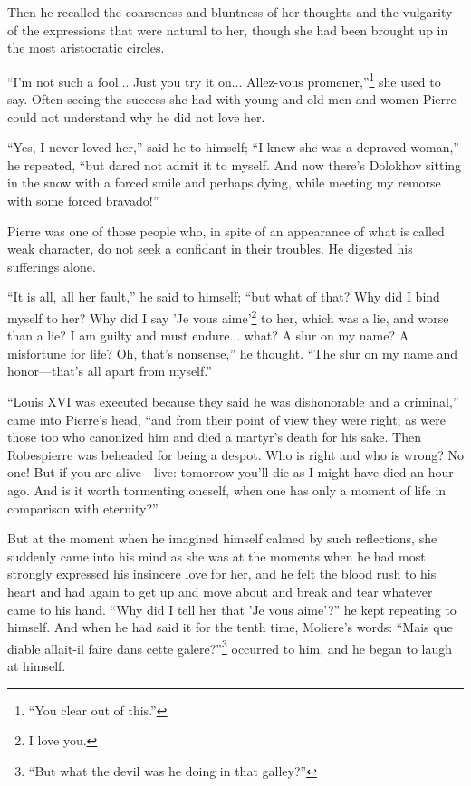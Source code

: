 Then he recalled the coarseness and bluntness of her thoughts and
the vulgarity of the expressions that were natural to her, though
she had been brought up in the most aristocratic circles.

``I'm not such a fool... Just you try it on... Allez-vous
promener,''\footnote{``You clear out of this.''}  she used to
say. Often seeing the success she had with young and old men and
women Pierre could not understand why he did not love her.

``Yes, I never loved her,'' said he to himself; ``I knew she was
a depraved woman,'' he repeated, ``but dared not admit it to
myself. And now there's Dolokhov sitting in the snow with a
forced smile and perhaps dying, while meeting my remorse with
some forced bravado!''

Pierre was one of those people who, in spite of an appearance of
what is called weak character, do not seek a confidant in their
troubles. He digested his sufferings alone.

``It is all, all her fault,'' he said to himself; ``but what of
that? Why did I bind myself to her? Why did I say 'Je vous
aime'\footnote{I love you.} to her, which was a lie, and worse
than a lie? I am guilty and must endure... what? A slur on my
name? A misfortune for life? Oh, that's nonsense,'' he
thought. ``The slur on my name and honor---that's all apart from
myself.''

``Louis XVI was executed because they said he was dishonorable
and a criminal,'' came into Pierre's head, ``and from their point
of view they were right, as were those too who canonized him and
died a martyr's death for his sake. Then Robespierre was beheaded
for being a despot.  Who is right and who is wrong? No one! But
if you are alive---live: tomorrow you'll die as I might have died
an hour ago. And is it worth tormenting oneself, when one has
only a moment of life in comparison with eternity?''

But at the moment when he imagined himself calmed by such
reflections, she suddenly came into his mind as she was at the
moments when he had most strongly expressed his insincere love
for her, and he felt the blood rush to his heart and had again to
get up and move about and break and tear whatever came to his
hand. ``Why did I tell her that 'Je vous aime'?'' he kept
repeating to himself. And when he had said it for the tenth time,
Moliere's words: ``Mais que diable allait-il faire dans cette
galere?''\footnote{``But what the devil was he doing in that
galley?''}  occurred to him, and he began to laugh at himself.

